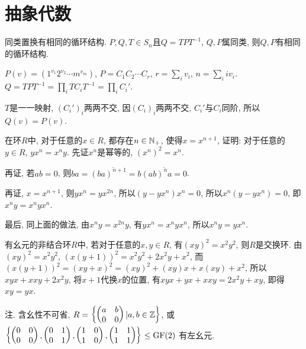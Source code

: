 \chapter{抽象代数}
\bt{}{}
同类置换有相同的循环结构.
\et
\ba
$P,Q,T\in S_n$且$Q=TPT^{-1}$, $Q,P$属同类, 则$Q,P$有相同的循环结构.

$P(v)=(1^{v_1}2^{v_2}\cdots m^{v_m})$, $P=C_1C_2\cdots C_r$, $r=\sum_iv_i$, $n=\sum_iiv_i$.
$Q=TPT^{-1}=\prod_iTC_iT^{-1}=\prod_iC_i'$. 

$T$是一一映射, $(C_i')_i$两两不交, 因$(C_i)_i$两两不交,
$C_i'$与$C_i$同阶, 所以$Q(v)=P(v)$.
\ea

\bq{}{}
在环$R$中, 对于任意的$x\in R$, 都存在$n\in\mathbb{N}_{+}$, 使得$x=x^{n+1}$, 证明: 对于任意的$y\in R$, $yx^n=x^ny$.
\eq
\ba
先证$x^n$是幂等的, $(x^n)^2=x^n$.

再证, 若$ab=0$, 则$ba=(ba)^{\tilde{n}+1}=b(ab)^{\tilde{n}}a=0$.

再证, $x=x^{n+1}$, 则$yx^n=yx^{2n}$, 所以$(y-yx^n)x^n=0$, 所以$x^n(y-yx^n)=0$, 即$x^ny=x^nyx^n$.

最后, 同上面的做法, 由$x^ny=x^{2n}y$, 有$yx^n=x^nyx^n$, 所以$x^ny=yx^n$.
\ea

有幺元的非结合环$R$中, 若对于任意的$x,y\in R$, 有$(xy)^2=x^2y^2$, 则$R$是交换环.
\eq
\ba
由$(xy)^2=x^2y^2$, $(x(y+1))^2=x^2y^2+2x^2y+x^2$, 而$(x(y+1))^2=(xy+x)^2=(xy)^2+(xy)x+x(xy)+x^2$, 
所以$xyx+xxy+2x^2y$, 将$x+1$代换$x$的位置, 有$xyx+yx+xxy=2x^2y+xy$, 即得$xy=yx$.

注. 含幺性不可省, $R=\left\{
\begin{pmatrix}
 a & b\\
 0 & 0
\end{pmatrix}
\large\vert
a,b\in\mathbb{Z}
\right\}$, 或$\left\{
\begin{pmatrix}
 0 & 0\\
 0 & 0
\end{pmatrix},
\begin{pmatrix}
 0 & 1\\
 0 & 1
\end{pmatrix},
\begin{pmatrix}
 1 & 0\\
 1 & 0
\end{pmatrix},
\begin{pmatrix}
 1 & 1\\
 1 & 1
\end{pmatrix}
\right\}\le \mathrm{GF}(2)$
有左幺元.

